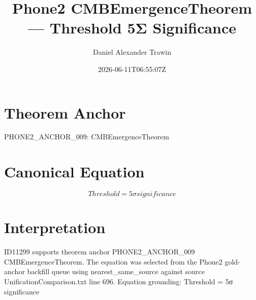 \documentclass[11pt]{article}
\title{Phone2 CMBEmergenceTheorem — Threshold 5Σ Significance}
\author{Daniel Alexander Trawin}
\date{2026-06-11T06:55:07Z}
\begin{document}
\maketitle
\section*{Theorem Anchor}
PHONE2_ANCHOR_009: CMBEmergenceTheorem
\section*{Canonical Equation}
\[
Threshold = 5σ significance
\]
\section*{Interpretation}
ID11299 supports theorem anchor PHONE2_ANCHOR_009 CMBEmergenceTheorem. The equation was selected from the Phone2 gold-anchor backfill queue using nearest_same_source against source UnificationComparison.txt line 696. Equation grounding: Threshold = 5σ significance
\end{document}
